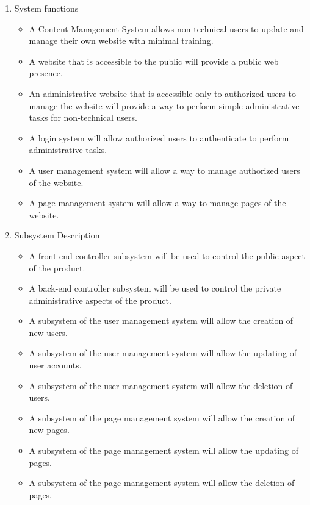\documentclass[11pt]{article}
\begin{document}
\begin{enumerate}
    \item System functions
    \begin{itemize}
    \item A Content Management System allows non-technical users to update and manage their own website with minimal training.
    \item A website that is accessible to the public will provide a public web presence.
    \item An administrative website that is accessible only to authorized users to manage the website will provide a way to perform simple administrative tasks for non-technical users.
    \item A login system will allow authorized users to authenticate to perform administrative tasks.
    \item A user management system will allow a way to manage authorized users of the website.
    \item A page management system will allow a way to manage pages of the website.
    \end{itemize}
    
    \item Subsystem Description
    \begin{itemize}
     \item A front-end controller subsystem will be used to control the public aspect of the product.
     \item A back-end controller subsystem will be used to control the private administrative aspects of the product.
     \item A subsystem of the user management system will allow the creation of new users.
     \item A subsystem of the user management system will allow the updating of user accounts.
     \item A subsystem of the user management system will allow the deletion of users.
     \item A subsystem of the page management system will allow the creation of new pages.
     \item A subsystem of the page management system will allow the updating of pages.
     \item A subsystem of the page management system will allow the deletion of pages.
     
\end{itemize}
\end{enumerate}
\end{document}
